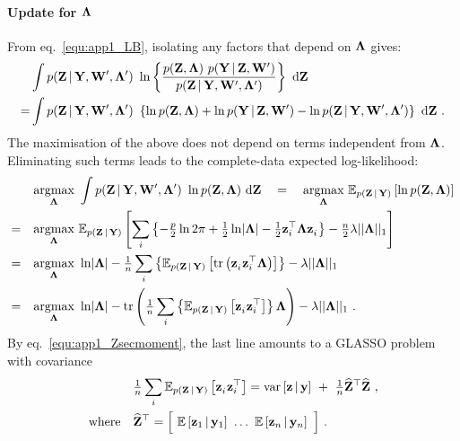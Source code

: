       \paragraph{Update for $\mathbf{\Lambda}$} From eq.~\eqref{equ:app1_LB}, isolating any factors that depend on $\mathbf{\Lambda}$ gives:
      \begin{align*}
	& \int p(\mathbf{Z} \,|\, \mathbf{Y}, \mathbf{W}^\prime, \mathbf{\Lambda}^\prime ) ~ \ln \left\{ \frac{ p(\mathbf{Z}, \mathbf{\Lambda} ) ~ p(\mathbf{Y} \,|\, \mathbf{Z}, \mathbf{W}^\prime) }{ p(\mathbf{Z} \,|\, \mathbf{Y}, \mathbf{W}^\prime, \mathbf{\Lambda}^\prime ) } \right\} ~ \textrm{d} \mathbf{Z} \\
	= & \int p(\mathbf{Z} \,|\, \mathbf{Y}, \mathbf{W}^\prime, \mathbf{\Lambda}^\prime ) ~ \left \{ \ln p(\mathbf{Z}, \mathbf{\Lambda} ) + \ln p(\mathbf{Y} \,|\, \mathbf{Z}, \mathbf{W}^\prime) - \ln p(\mathbf{Z} \,|\, \mathbf{Y}, \mathbf{W}^\prime, \mathbf{\Lambda}^\prime ) \right\} ~ \textrm{d} \mathbf{Z} ~.
      \end{align*}
      The maximisation of the above does not depend on terms independent from $\mathbf{\Lambda}$. Eliminating such terms leads to the complete-data expected log-likelihood:
      \begin{align*}
	&\underset{\mathbf{\Lambda}}{\textrm{argmax}}~ \int p(\mathbf{Z} \,|\, \mathbf{Y}, \mathbf{W}^\prime, \mathbf{\Lambda}^\prime ) ~ \ln p(\mathbf{Z}, \mathbf{\Lambda} ) ~ \textrm{d} \mathbf{Z} \quad = \quad \underset{\mathbf{\Lambda}}{\textrm{argmax}}~ \mathbb{E}_{p(\mathbf{Z}\,|\,\mathbf{Y})} \left[ \ln p(\mathbf{Z}, \mathbf{\Lambda} ) \right] \\
	= \quad &\underset{\mathbf{\Lambda}}{\textrm{argmax}} ~ \mathbb{E}_{ p(\mathbf{Z}\,|\,\mathbf{Y})} \left[ \sum_i \left\{ -\tfrac{p}{2} \ln 2 \pi + \tfrac{1}{2}\ln \lvert \mathbf{\Lambda} \rvert - \tfrac{1}{2} \mathbf{z}_i^\top \mathbf{\Lambda} \mathbf{z}_i^{~} \right\} - \tfrac{n}{2} \lambda \vert\vert \mathbf{\Lambda} \vert\vert_1  \right] \\
	= \quad &\underset{\mathbf{\Lambda}}{\textrm{argmax}} ~ \ln \lvert \mathbf{\Lambda} \rvert - \tfrac{1}{n} \sum_i \left\{ \mathbb{E}_{ p(\mathbf{Z}\,|\,\mathbf{Y})} \left[ \textrm{tr} \left(  \mathbf{z}_i^{~} \mathbf{z}_i^\top \mathbf{\Lambda}  \right) \right] \right\} - \lambda \vert\vert \mathbf{\Lambda} \vert\vert_1 \\
	= \quad &\underset{\mathbf{\Lambda}}{\textrm{argmax}} ~ \ln \lvert \mathbf{\Lambda} \rvert - \textrm{tr} \left(  \tfrac{1}{n} \sum_i \left\{  \mathbb{E}_{ p(\mathbf{Z}\,|\,\mathbf{Y})} \left[ \mathbf{z}_i^{~} \mathbf{z}_i^\top \right] \right\} \mathbf{\Lambda}  \right) - \lambda \vert\vert \mathbf{\Lambda} \vert\vert_1 ~.
      \end{align*}
      By eq.~\eqref{equ:app1_Zsecmoment}, the last line amounts to a GLASSO problem with covariance
      \begin{align*}
        &\tfrac{1}{n} \sum_i \mathbb{E}_{ p(\mathbf{Z}\,|\,\mathbf{Y})} \left[ \mathbf{z}_i^{~} \mathbf{z}_i^\top \right] = \textrm{var}\left[ \mathbf{z} \,|\, \mathbf{y} \right] ~+~ \tfrac{1}{n} \widehat{\mathbf{Z}}^\top \widehat{\mathbf{Z}} ~,\\
	\textrm{where} \quad &\widehat{\mathbf{Z}}^\top = \Big[~ \mathbb{E}\left[ \mathbf{z}_1 \,|\, \mathbf{y}_1 \right] ~\dots~ \mathbb{E}\left[ \mathbf{z}_n \,|\, \mathbf{y}_n \right] ~\Big] ~.
      \end{align*}
      


